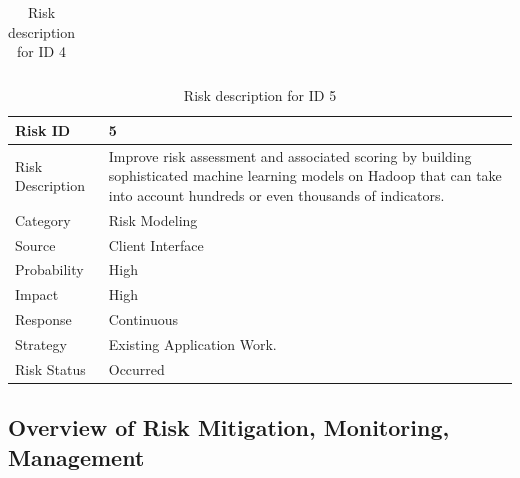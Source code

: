 \documentclass[oneside,a4paper,12pt]{book}
\begin{document}
\begin{center}
\begin{table}[H]
\begin{tabular}{p{1.09in}p{4.07in}}
\hline
\hline
\end{tabular}
\caption{Risk description for ID 4}
\end{table}
\begin{table}[H]
\centering
\begin{tabular}{p{1.09in}p{4.07in}}
\hline
\hline
\multicolumn{1}{p{1.09in}}{Risk ID} & 
\multicolumn{1}{p{4.07in}}{5} \\
\hline
\multicolumn{1}{p{1.09in}}{Risk Description} & 
\multicolumn{1}{p{4.07in}}{Improve risk assessment and associated scoring by building sophisticated machine learning models on Hadoop that can take into account hundreds or even thousands of indicators.} \\
\hline
\multicolumn{1}{p{1.09in}}{Category} & 
\multicolumn{1}{p{4.07in}}{Risk Modeling} \\
\hline
\multicolumn{1}{p{1.09in}}{Source} & 
\multicolumn{1}{p{4.07in}}{Client Interface} \\
\hline
\multicolumn{1}{p{1.09in}}{Probability} & 
\multicolumn{1}{p{4.07in}}{High} \\
\hline
\multicolumn{1}{p{1.09in}}{Impact} & 
\multicolumn{1}{p{4.07in}}{High} \\
\hline
\multicolumn{1}{p{1.09in}}{Response} & 
\multicolumn{1}{p{4.07in}}{Continuous} \\
\hline
\multicolumn{1}{p{1.09in}}{Strategy} & 
\multicolumn{1}{p{4.07in}}{Existing Application Work.} \\
\hline
\multicolumn{1}{p{1.09in}}{Risk Status} & 
\multicolumn{1}{p{4.07in}}{Occurred} \\
\hline
\hline
\end{tabular}
\caption{Risk description for ID 5}
\end{table}
\end{center}
\subsection{Overview of Risk Mitigation, Monitoring, Management}
\end{document}
